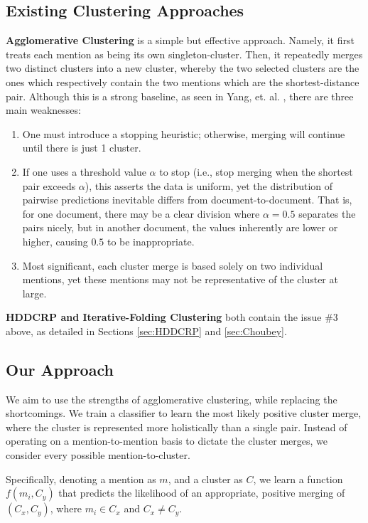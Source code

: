 \documentclass[11pt,a4paper]{article}
\begin{document}
\subsection{Existing Clustering Approaches}
\textbf{Agglomerative Clustering} is a simple but effective approach.  Namely, it first treats each mention as being its own singleton-cluster.  Then, it repeatedly merges two distinct clusters into a new cluster, whereby the two selected clusters are the ones which respectively contain the two mentions which are the shortest-distance pair.  Although this is a strong baseline, as seen in Yang, et. al. , there are three main weaknesses:
\begin{enumerate}
\item One must introduce a stopping heuristic; otherwise, merging will continue until there is just 1 cluster.
\item If one uses a threshold value $\alpha$ to stop (i.e., stop merging when the shortest pair exceeds $\alpha$), this asserts the data is uniform, yet the distribution of pairwise predictions inevitable differs from document-to-document.  That is, for one document, there may be a clear division where $\alpha = 0.5$ separates the pairs nicely, but in another document, the values inherently are lower or higher, causing $0.5$ to be inappropriate.
\item Most significant, each cluster merge is based solely on two individual mentions, yet these mentions may not be representative of the cluster at large.
\end{enumerate}

\textbf{HDDCRP and Iterative-Folding Clustering} both contain the issue \#3 above, as detailed in Sections \ref{sec:HDDCRP} and \ref{sec:Choubey}.

\subsection{Our Approach}
We aim to use the strengths of agglomerative clustering, while replacing the shortcomings.  We train a classifier to learn the most likely {positive cluster merge}, where the cluster is represented more holistically than a single pair.  Instead of operating on a mention-to-mention basis to dictate the cluster merges, we consider every possible mention-to-cluster.

Specifically, denoting a mention as $m$, and a cluster as $C$, we learn a function $f(m_i,C_y)$ that predicts the likelihood of an appropriate, positive merging of $(C_x,C_y)$, where $m_i \in C_x$ and $C_x \neq C_y$.
\end{document}
